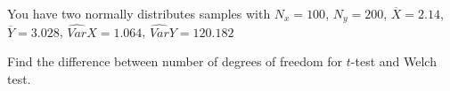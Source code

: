 
\begin{question}
You have two normally distributes samples with \(N_x=100\), \(N_y=200\), \(\overline{X} = 2.14\), \(\overline{Y} = 3.028\), \(\widehat{Var}{X} = 1.064\), \(\widehat{Var}{Y} = 120.182\)

Find the difference between number of degrees of freedom for \(t\)-test and Welch test.
\end{question}


